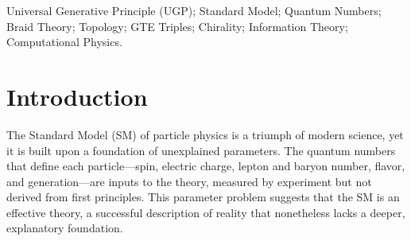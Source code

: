 \documentclass[11pt]{article}
\theoremstyle{remark}
\begin{document}
\begin{tcolorbox}[colback=gray!10,colframe=gray!75!black,title=Keywords]
Universal Generative Principle (UGP); Standard Model; Quantum Numbers; Braid Theory; Topology; GTE Triples; Chirality; Information Theory; Computational Physics.
\end{tcolorbox}

\section{Introduction}
\label{sec:introduction}

The Standard Model (SM) of particle physics is a triumph of modern science, yet it is built upon a foundation of unexplained parameters. The quantum numbers that define each particle---spin, electric charge, lepton and baryon number, flavor, and generation---are inputs to the theory, measured by experiment but not derived from first principles. This parameter problem suggests that the SM is an effective theory, a successful description of reality that nonetheless lacks a deeper, explanatory foundation.
\end{document}
